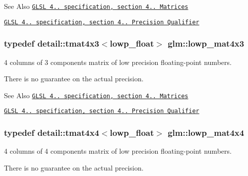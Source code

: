 \begin{DoxySeeAlso}{See Also}
\href{http://www.opengl.org/registry/doc/GLSLangSpec.4.20.8.pdf}{\tt G\-L\-S\-L 4.. specification, section 4.. Matrices} 

\href{http://www.opengl.org/registry/doc/GLSLangSpec.4.20.8.pdf}{\tt G\-L\-S\-L 4.. specification, section 4.. Precision Qualifier} 
\end{DoxySeeAlso}
\hypertarget{group__core__precision_ga072d9727aa59df856b83cfc01cb131bf}{
\subsubsection[{lowp\-\_\-mat4x3}]{\setlength{\rightskip}{0pt plus 5cm}typedef detail\-::tmat4x3$<$lowp\-\_\-float$>$ {\bf glm\-::lowp\-\_\-mat4x3}}}\label{group__core__precision_ga072d9727aa59df856b83cfc01cb131bf}


4 columns of 3 components matrix of low precision floating-\/point numbers. 

There is no guarantee on the actual precision.

\begin{DoxySeeAlso}{See Also}
\href{http://www.opengl.org/registry/doc/GLSLangSpec.4.20.8.pdf}{\tt G\-L\-S\-L 4.. specification, section 4.. Matrices} 

\href{http://www.opengl.org/registry/doc/GLSLangSpec.4.20.8.pdf}{\tt G\-L\-S\-L 4.. specification, section 4.. Precision Qualifier} 
\end{DoxySeeAlso}
\hypertarget{group__core__precision_gad3ab398e7b5115c5dcdbd497dea08664}{
\subsubsection[{lowp\-\_\-mat4x4}]{\setlength{\rightskip}{0pt plus 5cm}typedef detail\-::tmat4x4$<$lowp\-\_\-float$>$ {\bf glm\-::lowp\-\_\-mat4x4}}}\label{group__core__precision_gad3ab398e7b5115c5dcdbd497dea08664}


4 columns of 4 components matrix of low precision floating-\/point numbers. 

There is no guarantee on the actual precision.

